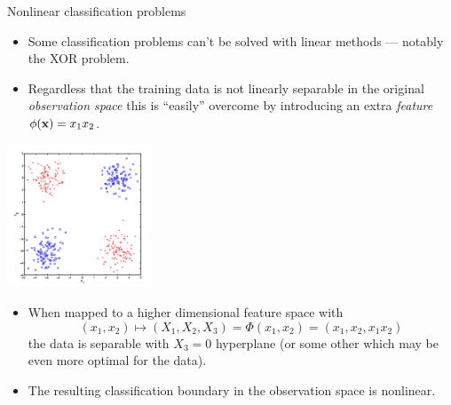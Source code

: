 \documentclass[handout]{beamer}   %
\def\b#1{{\bf #1}}
\begin{document}
\begin{frame}{Nonlinear classification problems}
  \begin{minipage}[c]{6.2cm}
    \begin{itemize}[<+->]
    \item Some classification problems can't be
      solved with linear methods --- notably the XOR problem.
    \item Regardless that the training data is not linearly
      separable in the original {\it observation space\/}
      this is ``easily'' overcome by introducing an extra
      {\it feature\/} $\phi(\b x)=x_1x_2$.
    \end{itemize}
  \end{minipage}
  \hfil
  \begin{minipage}[c]{4.4cm}
    \includegraphics[width=4.3cm]{xor.png}
  \end{minipage}
  \begin{itemize}[<+->]
  \item When mapped to a higher dimensional feature space with
    $$ (x_1,x_2) \mapsto (X_1,X_2,X_3)=\Phi(x_1,x_2)=(x_1,x_2,x_1x_2) $$
    the data is separable with $X_3=0$ hyperplane (or some other which may be even
    more optimal for the data).
  \item The resulting classification boundary in the observation space is nonlinear.
  \end{itemize}
\end{frame}
\end{document}
